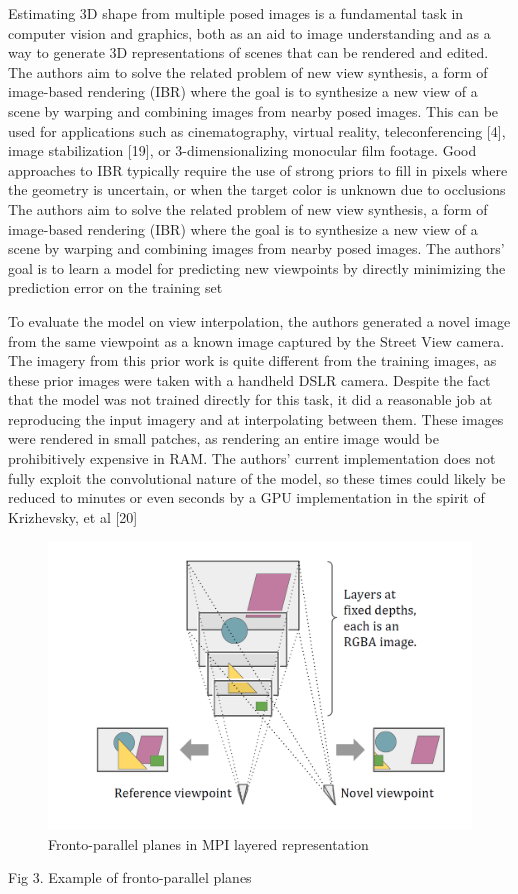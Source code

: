 Estimating 3D shape from multiple posed images is a fundamental task in computer vision and graphics, both as an aid to image understanding and as a way to generate 3D representations of scenes that can be rendered and edited. The authors aim to solve the related problem of new view synthesis, a form of image-based rendering (IBR) where the goal is to synthesize a new view of a scene by warping and combining images from nearby posed images. This can be used for applications such as cinematography, virtual reality, teleconferencing [4], image stabilization [19], or 3-dimensionalizing monocular film footage. Good approaches to IBR typically require the use of strong priors to fill in pixels where the geometry is uncertain, or when the target color is unknown due to occlusions The authors aim to solve the related problem of new view synthesis, a form of image-based rendering (IBR) where the goal is to synthesize a new view of a scene by warping and combining images from nearby posed images.
The authors' goal is to learn a model for predicting new viewpoints by directly minimizing the prediction error on the training set

To evaluate the model on view interpolation, the authors generated a novel image from the same viewpoint as a known image captured by the Street View camera.
The imagery from this prior work is quite different from the training images, as these prior images were taken with a handheld DSLR camera. Despite the fact that the model was not trained directly for this task, it did a reasonable job at reproducing the input imagery and at interpolating between them. These images were rendered in small patches, as rendering an entire image would be prohibitively expensive in RAM. The authors' current implementation does not fully exploit the convolutional nature of the model, so these times could likely be reduced to minutes or even seconds by a GPU implementation in the spirit of Krizhevsky, et al [20]

\begin{figure}[!h]
    \includegraphics[width=1\columnwidth]{figures/mpi-layered-representation.png}
    \caption{Fronto-parallel planes in MPI layered representation}
    \label{fig:mpi-layered-representation}
\end{figure}
Fig 3. Example of fronto-parallel planes

